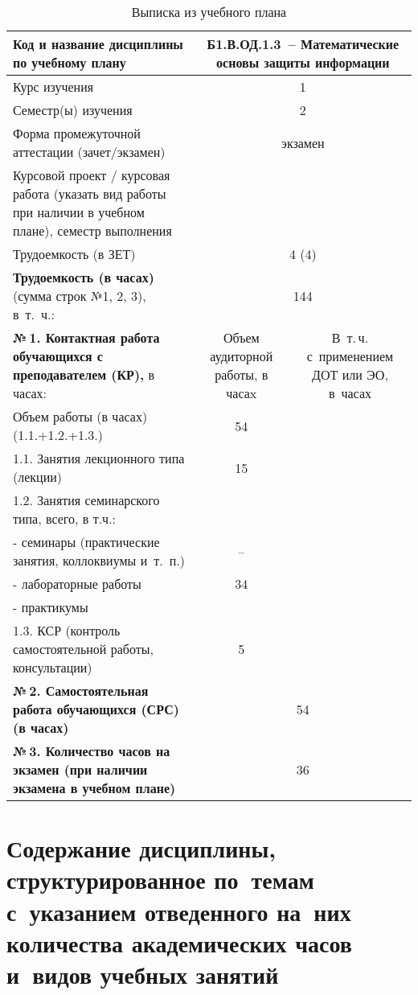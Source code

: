 \documentclass[a4paper,12pt]{article}
\begin{document}
\begin{table}[H]
\caption{Выписка из учебного плана} 
\begin{tabular}{|p{9cm}|c|c|}
\hline
Код и название дисциплины по учебному плану & \multicolumn{2}{p{6cm}|}{Б1.В.ОД.1.3\ -- Математические основы защиты информации }\\
\hline
Курс изучения &\multicolumn{2}{c|}{ 1 }\\
\hline
Семестр(ы) изучения &\multicolumn{2}{c|}{ 2 }\\
\hline
Форма промежуточной аттестации (зачет/экзамен) &\multicolumn{2}{c|}{ экзамен }\\
\hline
Курсовой проект / курсовая работа (указать вид работы при наличии в учебном плане), семестр выполнения &\multicolumn{2}{c|}{ }\\
\hline
Трудоемкость (в ЗЕТ) &\multicolumn{2}{c|}{ 4 (4) }\\
\hline
{\bf Трудоемкость (в часах)} (сумма строк №1, 2, 3), в~т.~ч.:& \multicolumn{2}{c|}{144}\\
\hline
\textbf{№\,1. Контактная работа обучающихся с преподавателем (КР),} в часах:
& \multicolumn{1}{p{3cm}|}{\centering Объем аудиторной работы, в часаx}
& \multicolumn{1}{p{3cm}|}{\centering\arraybackslash В~т.\,ч. с~применением ДОТ или ЭО, в~часах}\\
\hline  
Объем работы (в часах) (1.1.+1.2.+1.3.)& 54 & \\
\hline
1.1. Занятия лекционного типа (лекции) & 15 & \\
\hline
1.2. Занятия семинарского типа, всего, в т.ч.: & & \\
\hline
- семинары (практические занятия, коллоквиумы и~т.~п.)  & – & \\
\hline
- лабораторные работы& 34 & \\
\hline
- практикумы & & \\
\hline
1.3. КСР (контроль самостоятельной работы, консультации)& 5 & \\
\hline
{\bf №\,2. Самостоятельная работа обучающихся (СРС) (в часах)}& \multicolumn{2}{c|}{54}\\
\hline
{\bf №\,3. Количество часов на экзамен (при наличии экзамена в учебном плане)}& \multicolumn{2}{c|}{36}\\
\hline
\end{tabular}
\end{table}



\newpage
\section{Содержание дисциплины, структурированное по~темам с~указанием отведенного на~них количества академических часов и~видов учебных занятий}
\end{document}
